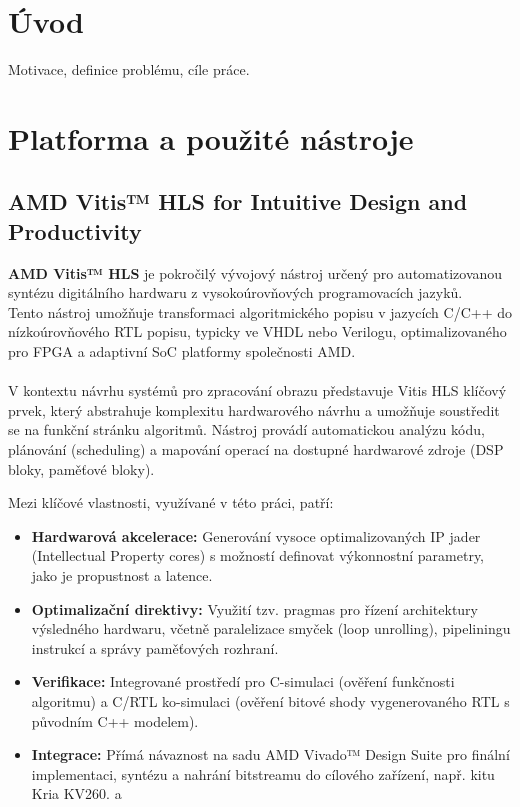 \documentclass[FM,DP]{tulthesis}
\begin{document}
\chapter{Úvod}

Motivace, definice problému, cíle práce.

\chapter{Platforma a použité nástroje}
\label{kap:nastroje}

\section{AMD Vitis™ HLS for Intuitive Design and Productivity}

\textbf{AMD Vitis™ HLS} je pokročilý vývojový nástroj určený pro automatizovanou syntézu digitálního hardwaru z vysokoúrovňových programovacích jazyků.\\Tento nástroj umožňuje transformaci algoritmického popisu v jazycích C/C++ do nízkoúrovňového \ac{RTL} popisu, typicky ve \ac{VHDL} nebo Verilogu, optimalizovaného pro \ac{FPGA} a adaptivní \ac{SoC} platformy společnosti AMD.
\\
\\
V kontextu návrhu systémů pro zpracování obrazu představuje Vitis HLS klíčový prvek, který abstrahuje komplexitu hardwarového návrhu a umožňuje soustředit se na funkční stránku algoritmů. Nástroj provádí automatickou analýzu kódu, plánování (scheduling) a mapování operací na dostupné hardwarové zdroje (DSP bloky, paměťové bloky).

Mezi klíčové vlastnosti, využívané v této práci, patří:

\begin{itemize}
    \item \textbf{Hardwarová akcelerace:} Generování vysoce optimalizovaných \ac{IP} jader (Intellectual Property cores) s možností definovat výkonnostní parametry, jako je propustnost a latence.

    \item \textbf{Optimalizační direktivy:} Využití tzv. pragmas pro řízení architektury výsledného hardwaru, včetně paralelizace smyček (loop unrolling), pipeliningu instrukcí a správy paměťových rozhraní.

    \item \textbf{Verifikace:} Integrované prostředí pro C-simulaci (ověření funkčnosti algoritmu) a C/RTL ko-simulaci (ověření bitové shody vygenerovaného \ac{RTL} s původním C++ modelem).

    \item \textbf{Integrace:} Přímá návaznost na sadu AMD Vivado™ Design Suite pro finální implementaci, syntézu a nahrání bitstreamu do cílového zařízení, např. kitu Kria KV260. a  \cite{amd_vitis}
\end{itemize}
\end{document}

